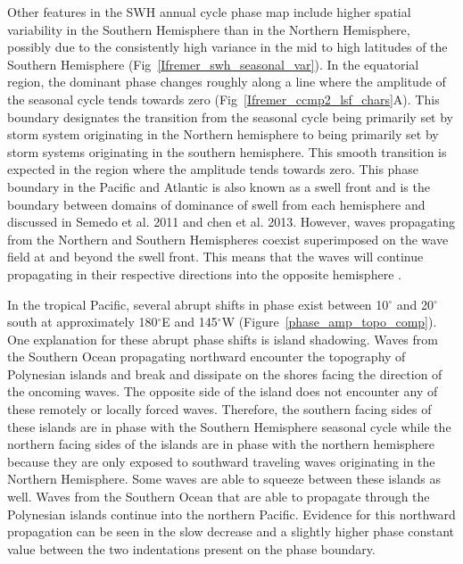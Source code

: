 \documentclass[draft,linenumbers]{agujournal2018}
\begin{document}
Other features in the SWH annual cycle phase map include higher spatial variability in the Southern Hemisphere than in the Northern Hemisphere, possibly due to the consistently high variance in the mid to high latitudes of the Southern Hemisphere (Fig~\ref{Ifremer_swh_seasonal_var}). In the equatorial region, the dominant phase changes roughly along a line where the amplitude of the seasonal cycle tends towards zero (Fig~\ref{Ifremer_ccmp2_lsf_chars}A). This boundary designates the transition from the seasonal cycle being primarily set by storm system originating in the Northern hemisphere to being primarily set by storm systems originating in the southern hemisphere. This smooth transition is expected in the region where the amplitude tends towards zero. This phase boundary in the Pacific and Atlantic is also known as a swell front \cite{young1999seasonal}  and is the boundary between domains of dominance of swell from each hemisphere and discussed in Semedo et al. 2011 and chen et al. 2013. However, waves propagating from the Northern and Southern Hemispheres coexist superimposed on the wave field at and beyond the swell front. This means that the waves will continue propagating in their respective directions into the opposite hemisphere \cite{echevarria2019seasonal}.

In the tropical Pacific, several abrupt shifts in phase exist between 10$^{\circ}$ and 20$^{\circ}$ south at approximately 180$^{\circ}$E and 145$^{\circ}$W (Figure~\ref{phase_amp_topo_comp}). One explanation for these abrupt phase shifts is island shadowing. Waves from the Southern Ocean propagating northward encounter the topography of Polynesian islands and break and dissipate on the shores facing the direction of the oncoming waves. The opposite side of the island does not encounter any of these remotely or locally forced waves. Therefore, the southern facing sides of these islands are in phase with the Southern Hemisphere seasonal cycle while the northern facing sides of the islands are in phase with the northern hemisphere because they are only exposed to southward traveling waves originating in the Northern Hemisphere. Some waves are able to squeeze between these islands as well. Waves from the Southern Ocean that are able to propagate through the Polynesian islands continue into the northern Pacific. Evidence for this northward propagation can be seen in the slow decrease and a slightly higher phase constant value between the two indentations present on the phase boundary.

\end{document}
